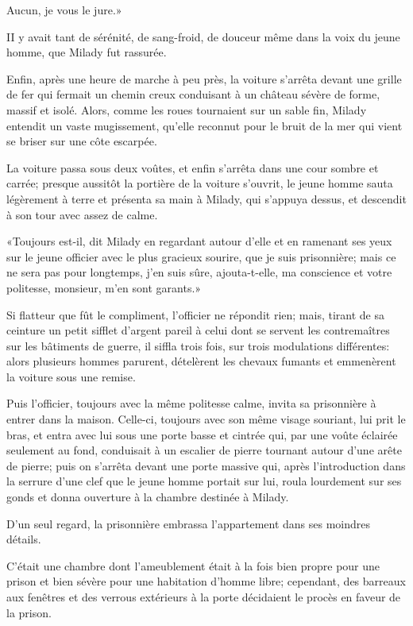 \speak  Aucun, je vous le jure.» 

II y avait tant de sérénité, de sang-froid, de douceur même dans la voix du jeune homme, que Milady fut rassurée. 

Enfin, après une heure de marche à peu près, la voiture s'arrêta devant une grille de fer qui fermait un chemin creux conduisant à un château sévère de forme, massif et isolé. Alors, comme les roues tournaient sur un sable fin, Milady entendit un vaste mugissement, qu'elle reconnut pour le bruit de la mer qui vient se briser sur une côte escarpée. 

La voiture passa sous deux voûtes, et enfin s'arrêta dans une cour sombre et carrée; presque aussitôt la portière de la voiture s'ouvrit, le jeune homme sauta légèrement à terre et présenta sa main à Milady, qui s'appuya dessus, et descendit à son tour avec assez de calme. 

«Toujours est-il, dit Milady en regardant autour d'elle et en ramenant ses yeux sur le jeune officier avec le plus gracieux sourire, que je suis prisonnière; mais ce ne sera pas pour longtemps, j'en suis sûre, ajouta-t-elle, ma conscience et votre politesse, monsieur, m'en sont garants.» 

Si flatteur que fût le compliment, l'officier ne répondit rien; mais, tirant de sa ceinture un petit sifflet d'argent pareil à celui dont se servent les contremaîtres sur les bâtiments de guerre, il siffla trois fois, sur trois modulations différentes: alors plusieurs hommes parurent, dételèrent les chevaux fumants et emmenèrent la voiture sous une remise. 

Puis l'officier, toujours avec la même politesse calme, invita sa prisonnière à entrer dans la maison. Celle-ci, toujours avec son même visage souriant, lui prit le bras, et entra avec lui sous une porte basse et cintrée qui, par une voûte éclairée seulement au fond, conduisait à un escalier de pierre tournant autour d'une arête de pierre; puis on s'arrêta devant une porte massive qui, après l'introduction dans la serrure d'une clef que le jeune homme portait sur lui, roula lourdement sur ses gonds et donna ouverture à la chambre destinée à Milady. 

D'un seul regard, la prisonnière embrassa l'appartement dans ses moindres détails. 

C'était une chambre dont l'ameublement était à la fois bien propre pour une prison et bien sévère pour une habitation d'homme libre; cependant, des barreaux aux fenêtres et des verrous extérieurs à la porte décidaient le procès en faveur de la prison. 

